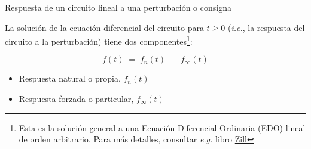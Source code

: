 \documentclass[aspectratio=169, usenames,svgnames,dvipsnames]{beamer}
\begin{document}

\begin{frame}{Respuesta de un circuito lineal a una perturbación o consigna}

    \vspace{2mm}
    La \alert{solución} de la ecuación diferencial del circuito para \hspace{1.5mm}\(t \geq 0\) \hspace{2mm}(\textit{i.e.}, la \alert{respuesta del circuito} a la perturbación) \hspace{1mm}tiene \alert{dos componentes}\footnote{Esta es la solución general a una Ecuación Diferencial Ordinaria (EDO) lineal de orden arbitrario. Para más detalles, consultar \textit{e.g.} libro \href{https://ingenio.upm.es/primo-explore/fulldisplay?docid=34UPM_ALMA2169152810004212\&context=L&vid=34UPM_VU1\&lang=es_ES\&search_scope=TAB1_SCOPE1\&adaptor=Local\%20Search\%20Engine\&isFrbr=true\&tab=tab1\&query=any,contains,zill\%20ecuaciones\%20diferenciales\&offset=0}{Zill}}:
    
    \[
        \boxed{\;\; f(t) \;=\; f_n(t) \;+\; f_\infty(t) \;\;}
    \]


    \normalsize
    \vspace{3mm}
    \begin{itemize}
        \item Respuesta \alert{natural} o propia, \hspace{3mm}\(f_n(t)\)

        \vspace{3mm}
        \item Respuesta \alert{forzada} o particular, \hspace{3mm}\(f_\infty(t)\)
    \end{itemize}
\end{frame}

\end{document}

